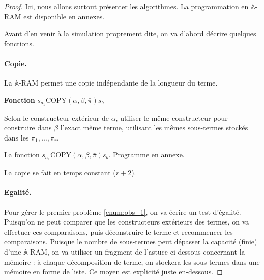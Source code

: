\documentclass{report}
\newcommand{\bbA}{\mathbb{A}}
\begin{document}
				\begin{proof}
					Ici, nous allons surtout présenter les algorithmes. La programmation en $\bbA$-RAM est disponible en \hyperref[sec:annexes_programmes]{annexes}.
					
					Avant d'en venir à la simulation proprement dite, on va d'abord décrire quelques fonctions.
			
					
					\paragraph{Copie.}
					
					La $\bbA$-RAM permet une copie indépendante de la longueur du terme. 
					
					\espace 
					
					\begin{algorithm}[H]
						\label{algo:A_RAM_fn_COPY}
						
						\textbf{Fonction} $s_{a_1}\text{COPY}(\alpha, \beta, \bar{\pi}) s_b$
						
						
						\espace 
						
						
							
						Selon le constructeur extérieur de $\alpha$, utiliser le même constructeur pour construire dans $\beta$ l'exact même terme, utilisant les mêmes sous-termes stockés dans les $\pi_1, \dots, \pi_r$.
						
						\caption{La fonction $s_{a_1}\text{COPY}(\alpha, \beta, \bar{\pi}) s_b$. Programme \hyperref[prog:A_RAM_fn_COPY]{en annexe}.}
					\end{algorithm}
						
					\espace
					
					La copie se fait en temps constant ($r+2$).
					
	
					\paragraph{Egalité.}
					Pour gérer le premier problème \ref{enum:obs_1}, on va écrire un test d'égalité. Puisqu'on ne peut comparer que les constructeurs extérieurs des termes, on va effectuer ces comparaisons, puis déconstruire le terme et recommencer les comparaisons. Puisque le nombre de sous-termes peut dépasser la capacité (finie) d'une $\bbA$-RAM, on va utiliser un fragment de l'astuce ci-dessous concernant la mémoire : à chaque décomposition de terme, on stockera les sous-termes dans une mémoire en forme de liste. Ce moyen est explicité juste \hyperref[par:A_RAM_memoire]{en-dessous}.
	

\end{proof}
\end{document}
